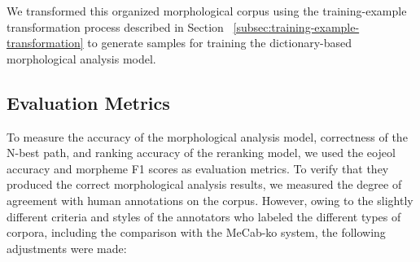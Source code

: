 \documentclass[AMS,STIX2COL]{WileyNJD-v2}
\begin{document}
    We transformed this organized morphological corpus using the training-example transformation process described in Section ~\ref{subsec:training-example-transformation} to generate samples for training the dictionary-based morphological analysis model.

    \subsection{Evaluation Metrics}\label{subsec:evaluation-metrics}

    To measure the accuracy of the morphological analysis model, correctness of the N-best path, and ranking accuracy of the reranking model, we used the eojeol accuracy and morpheme F1 scores as evaluation metrics.
    To verify that they produced the correct morphological analysis results, we measured the degree of agreement with human annotations on the corpus.
    However, owing to the slightly different criteria and styles of the annotators who labeled the different types of corpora, including the comparison with the MeCab-ko system, the following adjustments were made:
\end{document}
